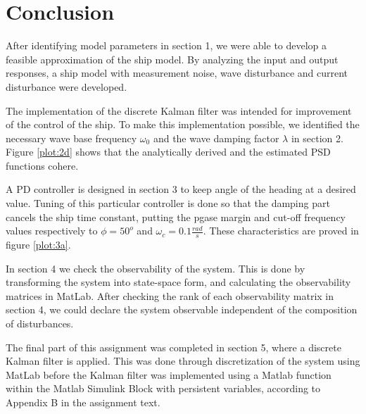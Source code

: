 \newpage
\section{Conclusion}

After identifying model parameters in section 1, we were able to develop a feasible approximation of the ship model. By analyzing the input and output responses, a ship model with measurement noise, wave disturbance and current disturbance were developed. 

The implementation of the discrete Kalman filter was intended for improvement of the control of the ship. To make this implementation possible, we identified the necessary wave base frequency $\omega_{0}$ and the wave damping factor $\lambda$ in section 2. Figure \ref{plot:2d} shows that the analytically derived and the estimated PSD functions cohere. 

A PD controller is designed in section 3 to keep angle of the heading at a desired value. Tuning of this particular controller is done so that the damping part cancels the ship time constant, putting the pgase margin and cut-off frequency values respectively to $\phi  = {50^o}$ and ${\omega _c} = 0.1\frac{{rad}}{s}$. These characteristics are proved in figure \ref{plot:3a}.

In section 4 we check the observability of the system. This is done by transforming the system into state-space form, and calculating the observability matrices in MatLab. After checking the rank of each observability matrix in section 4, we could declare the system observable independent of the composition of disturbances.

The final part of this assignment was completed in section 5, where a discrete Kalman filter is applied. This was done through discretization of the system using MatLab before the Kalman filter was implemented using a Matlab function within the Matlab Simulink Block with persistent variables, according to Appendix B in the assignment text.
